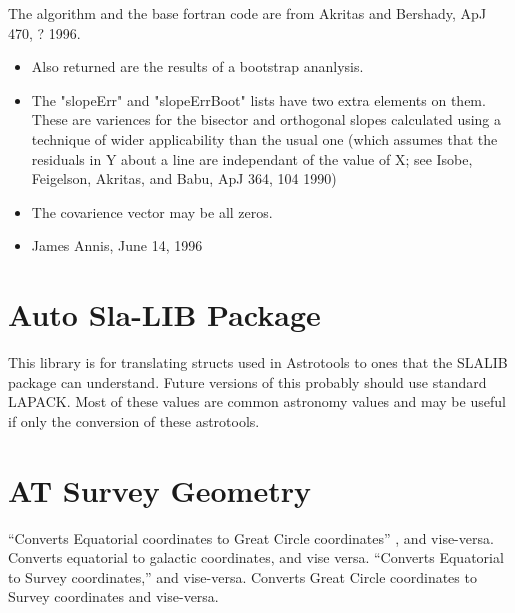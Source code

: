 \documentclass[11pt]{article}
\begin{document}
The algorithm and the base fortran code are from Akritas and Bershady, ApJ 470, ? 1996.
\begin{itemize}
\item Also returned are the results of a bootstrap ananlysis.
\item The "slopeErr" and "slopeErrBoot" lists have two extra elements on them. These are variences for the bisector and orthogonal slopes calculated using a technique of wider applicability than the usual one (which assumes that the residuals in Y about a line are independant of the value of X; see Isobe, Feigelson, Akritas, and Babu, ApJ 364, 104 1990)
\item The covarience vector may be all zeros.
\item James Annis, June 14, 1996 
\end{itemize}


\section {Auto Sla-LIB Package}
This library is for translating structs used in Astrotools to ones that the SLALIB package can understand.  Future versions of this probably should use standard LAPACK.  Most of these values are common astronomy values and may be useful if only the conversion of these astrotools.  

\section {AT Survey Geometry} 
``Converts Equatorial coordinates to Great Circle coordinates'' , and vise-versa.  Converts equatorial to galactic coordinates, and vise versa.   ``Converts Equatorial to Survey coordinates,'' and vise-versa.    Converts Great Circle coordinates to Survey coordinates and vise-versa.
\end{document}
